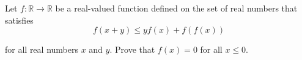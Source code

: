 Let 
$f : \mathbb R \to \mathbb R$
 be a real-valued function defined on the set of real numbers that satisfies
\[f(x + y) \leq yf(x) + f(f(x))\]


for all real numbers 
$x$
 and 
$y$.
 Prove that 
$f(x) = 0$
 for all 
$x \leq 0$.
